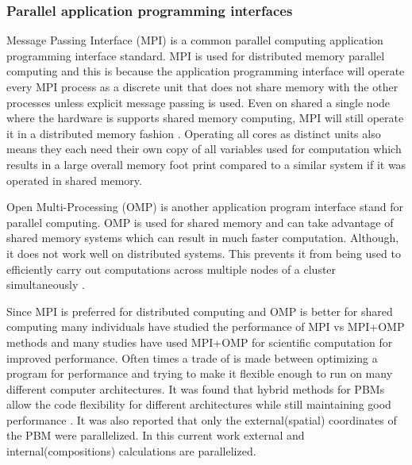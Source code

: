 \documentclass[preprint,11pt,authoryear]{elsarticle}
\begin{document}
\subsubsection{Parallel application programming interfaces}
Message Passing Interface (MPI) is a common parallel computing application 
programming interface standard. MPI is used for distributed memory parallel computing and this is 
because the application programming interface will operate 
every MPI process as a discrete unit that does not share memory with the other processes unless explicit 
message passing is used. Even on shared a single node where the hardware is supports shared 
memory computing, MPI will still operate it in a distributed memory fashion \citep{Jin2011}. Operating all 
cores as distinct units also means they each need their own copy of all variables used for computation 
which results in a large overall memory foot print compared to a similar system if it was operated in 
shared memory. 

Open Multi-Processing (OMP) is another application program interface stand for parallel 
computing. OMP is used for shared memory and can take advantage of shared memory systems which 
can result in much faster computation. Although, it does not work well on distributed systems. This 
prevents it from being used to efficiently carry out computations across multiple nodes of a cluster 
simultaneously \citep{Jin2011}. 

Since MPI is preferred for distributed computing and OMP is better for shared computing many 
individuals have studied the performance of MPI vs MPI+OMP methods and many studies have used 
MPI+OMP for scientific computation for improved performance. Often times a trade of is made 
between optimizing a program for performance and trying to make it flexible enough to run on many 
different computer architectures. It was found that hybrid methods for PBMs allow the code 
flexibility for different architectures while still maintaining good performance \citep{Bettencourt2017}.  
It was also reported that only the external(spatial) coordinates of the PBM were parallelized. 
In this current work external and internal(compositions) calculations are parallelized. 
\end{document}
